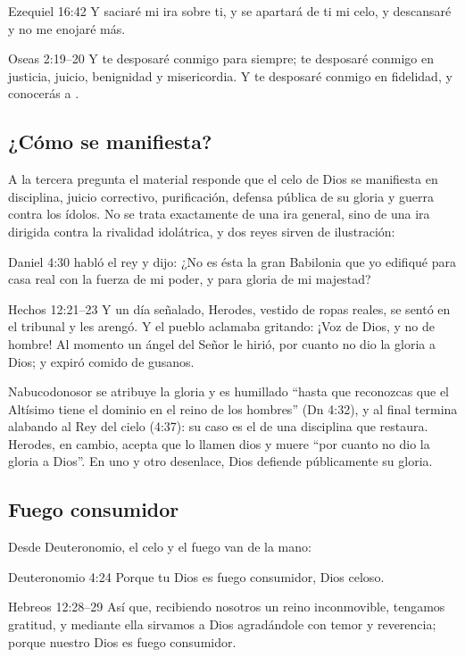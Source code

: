 \begin{verso}{Ezequiel 16:42}
Y saciaré mi ira sobre ti, y se apartará de ti mi celo, y descansaré y no me enojaré más.
\end{verso}
\begin{verso}{Oseas 2:19–20}
Y te desposaré conmigo para siempre; te desposaré conmigo en justicia, juicio, benignidad y misericordia. Y te desposaré conmigo en fidelidad, y conocerás a \SENOR.
\end{verso}

\subsection{¿Cómo se manifiesta?}
A la tercera pregunta el material responde que el celo de Dios se manifiesta en disciplina, juicio correctivo, purificación, defensa pública de su gloria y guerra contra los ídolos. No se trata exactamente de una ira general, sino de una ira dirigida contra la rivalidad idolátrica, y dos reyes sirven de ilustración:

\begin{verso}{Daniel 4:30}
habló el rey y dijo: ¿No es ésta la gran Babilonia que yo edifiqué para casa real con la fuerza de mi poder, y para gloria de mi majestad?
\end{verso}
\begin{verso}{Hechos 12:21–23}
Y un día señalado, Herodes, vestido de ropas reales, se sentó en el tribunal y les arengó. Y el pueblo aclamaba gritando: ¡Voz de Dios, y no de hombre! Al momento un ángel del Señor le hirió, por cuanto no dio la gloria a Dios; y expiró comido de gusanos.
\end{verso}

Nabucodonosor se atribuye la gloria y es humillado ``hasta que reconozcas que el Altísimo tiene el dominio en el reino de los hombres'' (Dn 4:32), y al final termina alabando al Rey del cielo (4:37): su caso es el de una disciplina que restaura. Herodes, en cambio, acepta que lo llamen dios y muere ``por cuanto no dio la gloria a Dios''. En uno y otro desenlace, Dios defiende públicamente su gloria.

\subsection{Fuego consumidor}
Desde Deuteronomio, el celo y el fuego van de la mano:

\begin{verso}{Deuteronomio 4:24}
Porque \SENOR{} tu Dios es fuego consumidor, Dios celoso.
\end{verso}
\begin{verso}{Hebreos 12:28–29}
Así que, recibiendo nosotros un reino inconmovible, tengamos gratitud, y mediante ella sirvamos a Dios agradándole con temor y reverencia; porque nuestro Dios es fuego consumidor.
\end{verso}

